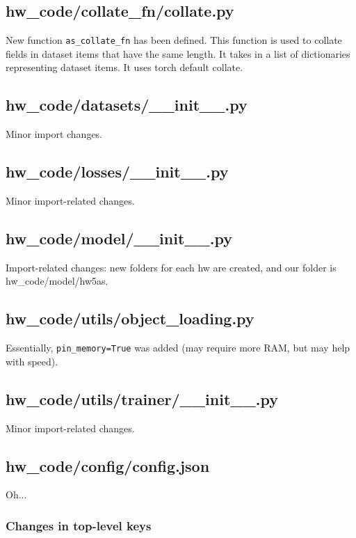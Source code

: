 \documentclass[a4paper]{article}
\begin{document}
\subsection{hw\_code/collate\_fn/collate.py}

New function \texttt{as\_collate\_fn} has been defined. This function is used to collate fields in dataset items that have the same length. It takes in a list of dictionaries representing dataset items. It uses torch default collate.

\subsection{hw\_code/datasets/\_\_init\_\_.py}

Minor import changes.

\subsection{hw\_code/losses/\_\_init\_\_.py}

Minor import-related changes.

\subsection{hw\_code/model/\_\_init\_\_.py}

Import-related changes: new folders for each hw are created, and our folder is hw\_code/model/hw5as.

\subsection{hw\_code/utils/object\_loading.py}

Essentially, \verb|pin_memory=True| was added (may require more RAM, but may help with speed).

\subsection{hw\_code/utils/trainer/\_\_init\_\_.py}

Minor import-related changes.

\subsection{hw\_code/config/config.json}

Oh...

\subsubsection{Changes in top-level keys}
\end{document}
